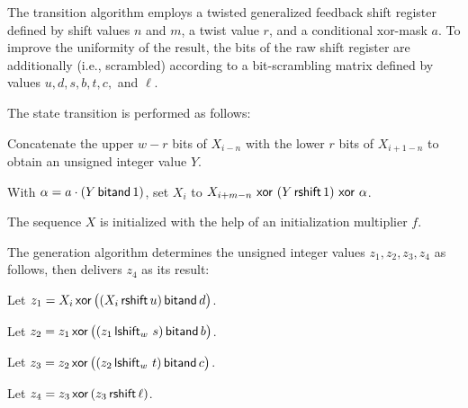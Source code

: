 \pnum
The transition algorithm%
%
employs a twisted generalized feedback shift register
defined by shift values $n$ and $m$, a twist value $r$,
and a conditional xor-mask $a$.
To improve the uniformity of the result,
the bits of the raw shift register are additionally 
(i.e., scrambled)
according to a bit-scrambling matrix
defined by values $u, d, s, b, t, c,$ and $\ell$.

The state transition is performed as follows:
\begin{enumeratea}
 \item
   Concatenate
     the upper $w-r$ bits of $X_{i-n}$
   with
     the lower $r$ bits of $X_{i+1-n}$
   to obtain an unsigned integer value $Y$.
 \item
   With $\alpha = a \cdot (Y \, \mathsf{bitand} \, 1)$,
   set $X_i$ to
     $X_{i+m-n} \, \, \mathsf{xor} \, \, (Y \, \mathsf{rshift} \, 1) \, \, \mathsf{xor} \, \, \alpha$.
\end{enumeratea}
The sequence $X$ is initialized
with the help of an initialization multiplier $f$.

\pnum
The generation algorithm%
%
 determines the unsigned integer values $z_1, z_2, z_3, z_4$ as follows,
 then delivers $z_4$ as its result:
\begin{enumeratea}
 \item
   Let $z_1 = X_i \, \mathsf{xor} \, \bigl(( X_i \, \mathsf{rshift} \, u ) \, \mathsf{bitand} \, d\bigr)$.
 \item
   Let $z_2 = z_1 \, \mathsf{xor} \, \bigl( (z_1 \, \mathsf{lshift}_w \, \, s) \, \mathsf{bitand} \, b \bigr)$.
 \item
   Let $z_3 = z_2 \, \mathsf{xor} \, \bigl( (z_2 \, \mathsf{lshift}_w \, \, t) \, \mathsf{bitand} \, c \bigr)$.
 \item
   Let $z_4 = z_3 \, \mathsf{xor} \, ( z_3 \, \mathsf{rshift} \, \ell )$.
\end{enumeratea}


